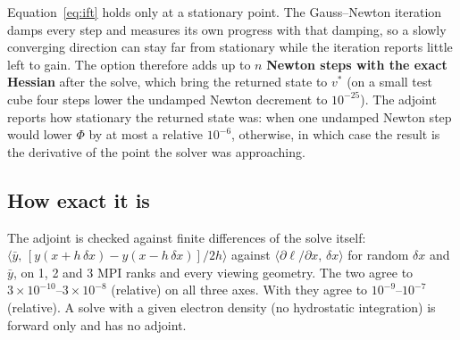 Equation~\eqref{eq:ift} holds only at a stationary point. The Gauss--Newton iteration damps every step and measures its own
progress with that damping, so a slowly converging direction can stay far from stationary while the iteration reports
little left to gain. The option  therefore adds up to $n$ \textbf{Newton steps with the exact Hessian} after the
solve, which bring the returned state to $v^*$ (on a small test cube four steps lower the undamped Newton decrement to
$10^{-25}$). The adjoint reports how stationary the returned state was:  when one undamped Newton step
would lower $\Phi$ by at most a relative $10^{-6}$,  otherwise, in which case the result is the
derivative of the point the solver was approaching.
\fi

\subsection{How exact it is}
The adjoint is checked against finite differences of the solve itself: $\langle\bar y,\,[y(x+h\,\delta x)-y(x-h\,\delta x)]/2h\rangle$
against $\langle\partial\ell/\partial x,\,\delta x\rangle$ for random $\delta x$ and $\bar y$, on 1, 2 and 3 MPI ranks and every
viewing geometry.
\ifadjointcolumn
The two agree to $3\times10^{-10}$--$3\times10^{-8}$ (relative) on all three axes.
\fi
\ifadjointpoisson
With  they agree to $10^{-9}$--$10^{-7}$ (relative).
\fi
A solve with a given electron density (no hydrostatic integration) is forward only and has no adjoint.
